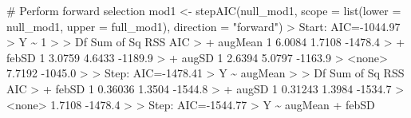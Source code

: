 \documentclass[
  letterpaper,
]{book}
\newenvironment{Shaded}{\begin{snugshade}}{\end{snugshade}}
\newcommand{\AttributeTok}[1]{\textcolor[rgb]{0.40,0.45,0.13}{#1}}
\newcommand{\CommentTok}[1]{\textcolor[rgb]{0.37,0.37,0.37}{#1}}
\newcommand{\DecValTok}[1]{\textcolor[rgb]{0.68,0.00,0.00}{#1}}
\newcommand{\ErrorTok}[1]{\textcolor[rgb]{0.68,0.00,0.00}{#1}}
\newcommand{\FloatTok}[1]{\textcolor[rgb]{0.68,0.00,0.00}{#1}}
\newcommand{\FunctionTok}[1]{\textcolor[rgb]{0.28,0.35,0.67}{#1}}
\newcommand{\NormalTok}[1]{\textcolor[rgb]{0.00,0.23,0.31}{#1}}
\newcommand{\OtherTok}[1]{\textcolor[rgb]{0.00,0.23,0.31}{#1}}
\newcommand{\SpecialCharTok}[1]{\textcolor[rgb]{0.37,0.37,0.37}{#1}}
\newcommand{\StringTok}[1]{\textcolor[rgb]{0.13,0.47,0.30}{#1}}
\begin{document}
\begin{Shaded}
\begin{Highlighting}[]
\CommentTok{\# Perform forward selection}
\NormalTok{mod1 }\OtherTok{\textless{}{-}} \FunctionTok{stepAIC}\NormalTok{(null\_mod1,}
                \AttributeTok{scope =} \FunctionTok{list}\NormalTok{(}\AttributeTok{lower =}\NormalTok{ null\_mod1, }\AttributeTok{upper =}\NormalTok{ full\_mod1),}
                \AttributeTok{direction =} \StringTok{"forward"}\NormalTok{)}
\SpecialCharTok{\textgreater{}}\NormalTok{ Start}\SpecialCharTok{:}\NormalTok{  AIC}\OtherTok{=}\SpecialCharTok{{-}}\FloatTok{1044.97}
\SpecialCharTok{\textgreater{}}\NormalTok{ Y }\SpecialCharTok{\textasciitilde{}} \DecValTok{1}
\SpecialCharTok{\textgreater{}} 
\ErrorTok{\textgreater{}}\NormalTok{           Df Sum of Sq    RSS     AIC}
\SpecialCharTok{\textgreater{}} \SpecialCharTok{+}\NormalTok{ augMean  }\DecValTok{1}    \FloatTok{6.0084} \FloatTok{1.7108} \SpecialCharTok{{-}}\FloatTok{1478.4}
\SpecialCharTok{\textgreater{}} \SpecialCharTok{+}\NormalTok{ febSD    }\DecValTok{1}    \FloatTok{3.0759} \FloatTok{4.6433} \SpecialCharTok{{-}}\FloatTok{1189.9}
\SpecialCharTok{\textgreater{}} \SpecialCharTok{+}\NormalTok{ augSD    }\DecValTok{1}    \FloatTok{2.6394} \FloatTok{5.0797} \SpecialCharTok{{-}}\FloatTok{1163.9}
\SpecialCharTok{\textgreater{}} \ErrorTok{\textless{}}\NormalTok{none}\SpecialCharTok{\textgreater{}}                 \FloatTok{7.7192} \SpecialCharTok{{-}}\FloatTok{1045.0}
\SpecialCharTok{\textgreater{}} 
\ErrorTok{\textgreater{}}\NormalTok{ Step}\SpecialCharTok{:}\NormalTok{  AIC}\OtherTok{=}\SpecialCharTok{{-}}\FloatTok{1478.41}
\SpecialCharTok{\textgreater{}}\NormalTok{ Y }\SpecialCharTok{\textasciitilde{}}\NormalTok{ augMean}
\SpecialCharTok{\textgreater{}} 
\ErrorTok{\textgreater{}}\NormalTok{         Df Sum of Sq    RSS     AIC}
\SpecialCharTok{\textgreater{}} \SpecialCharTok{+}\NormalTok{ febSD  }\DecValTok{1}   \FloatTok{0.36036} \FloatTok{1.3504} \SpecialCharTok{{-}}\FloatTok{1544.8}
\SpecialCharTok{\textgreater{}} \SpecialCharTok{+}\NormalTok{ augSD  }\DecValTok{1}   \FloatTok{0.31243} \FloatTok{1.3984} \SpecialCharTok{{-}}\FloatTok{1534.7}
\SpecialCharTok{\textgreater{}} \ErrorTok{\textless{}}\NormalTok{none}\SpecialCharTok{\textgreater{}}               \FloatTok{1.7108} \SpecialCharTok{{-}}\FloatTok{1478.4}
\SpecialCharTok{\textgreater{}} 
\ErrorTok{\textgreater{}}\NormalTok{ Step}\SpecialCharTok{:}\NormalTok{  AIC}\OtherTok{=}\SpecialCharTok{{-}}\FloatTok{1544.77}
\SpecialCharTok{\textgreater{}}\NormalTok{ Y }\SpecialCharTok{\textasciitilde{}}\NormalTok{ augMean }\SpecialCharTok{+}\NormalTok{ febSD}

\end{Highlighting}
\end{Shaded}
\end{document}
